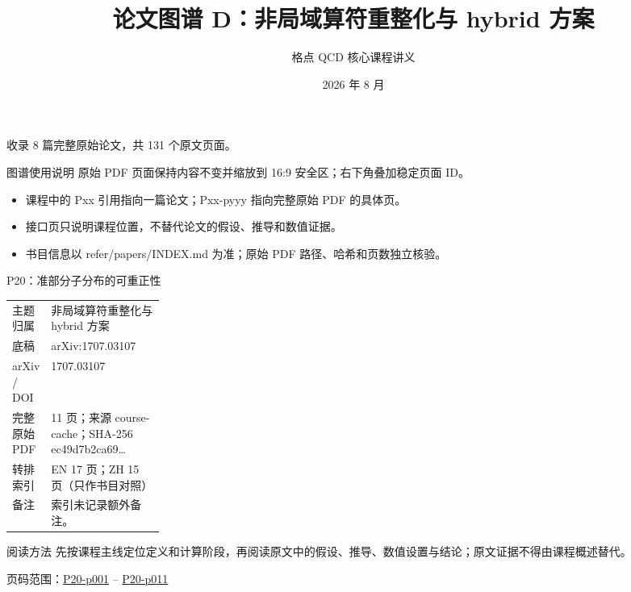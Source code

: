 \documentclass[aspectratio=169,10pt]{ctexbeamer}
\title{论文图谱 D：非局域算符重整化与 hybrid 方案}
\author{格点 QCD 核心课程讲义}
\date{2026 年 8 月}
\begin{document}
\begin{frame}[plain]\titlepage
\vfill\centering 收录 8 篇完整原始论文，共 131 个原文页面。
\end{frame}
\begin{frame}[t]{图谱使用说明}
\small 原始 PDF 页面保持内容不变并缩放到 16:9 安全区；右下角叠加稳定页面 ID。
\begin{itemize}
\item 课程中的 Pxx 引用指向一篇论文；Pxx-pyyy 指向完整原始 PDF 的具体页。
\item 接口页只说明课程位置，不替代论文的假设、推导和数值证据。
\item 书目信息以 refer/papers/INDEX.md 为准；原始 PDF 路径、哈希和页数独立核验。
\end{itemize}\end{frame}
\begin{frame}[t]{P20：准部分子分布的可重正性}
\small\begin{tabularx}{\linewidth}{p{0.22\linewidth}Y}
\toprule 主题归属 & 非局域算符重整化与 hybrid 方案\\
底稿 & arXiv:1707.03107\\
arXiv / DOI & 1707.03107\\
完整原始 PDF & 11 页；来源 course-cache；SHA-256 ec49d7b2ca69\ldots\\
转排索引 & EN 17 页；ZH 15 页（只作书目对照）\\
备注 & 索引未记录额外备注。\\
\bottomrule\end{tabularx}\vspace{0.25cm}
\begin{block}{阅读方法}
先按课程主线定位定义和计算阶段，再阅读原文中的假设、推导、数值设置与结论；原文证据不得由课程概述替代。
\end{block}
\vfill 页码范围：\hyperlink{P20-p001}{P20-p001} -- \hyperlink{P20-p011}{P20-p011}
\end{frame}
\end{document}
